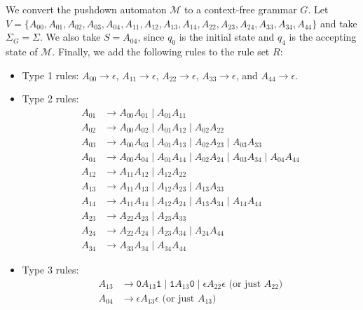 \begin{example}
We convert the pushdown automaton $\mathcal{M}$ to a context-free grammar $G$. Let $V = \{A_{00}, A_{01}, A_{02}, A_{03}, A_{04}, A_{11}, A_{12}, A_{13}, A_{14}, A_{22}, A_{23}, A_{24}, \allowbreak A_{33}, A_{34}, A_{44}\}$ and take $\Sigma_{G} = \Sigma$. We also take $S = A_{04}$, since $q_{0}$ is the initial state and $q_{4}$ is the accepting state of $\mathcal{M}$. Finally, we add the following rules to the rule set $R$:
\begin{itemize}
\item Type 1 rules: 
$A_{00} \rightarrow \epsilon$, 
$A_{11} \rightarrow \epsilon$, 
$A_{22} \rightarrow \epsilon$,  
$A_{33} \rightarrow \epsilon$, and 
$A_{44} \rightarrow \epsilon$.
\item Type 2 rules: 
\begin{align*}
A_{01} &\rightarrow A_{00}A_{01} \mid A_{01}A_{11} \\
A_{02} &\rightarrow A_{00}A_{02} \mid  A_{01}A_{12} \mid A_{02}A_{22} \\
A_{03} &\rightarrow A_{00}A_{03} \mid A_{01}A_{13} \mid A_{02}A_{23} \mid A_{03}A_{33} \\
A_{04} &\rightarrow A_{00}A_{04} \mid A_{01}A_{14} \mid A_{02}A_{24} \mid A_{03}A_{34} \mid A_{04}A_{44} \\
A_{12} &\rightarrow A_{11}A_{12} \mid A_{12}A_{22} \\
A_{13} &\rightarrow A_{11}A_{13} \mid A_{12}A_{23} \mid A_{13}A_{33} \\
A_{14} &\rightarrow A_{11}A_{14} \mid A_{12}A_{24} \mid A_{13}A_{34} \mid A_{14}A_{44} \\
A_{23} &\rightarrow A_{22}A_{23} \mid A_{23}A_{33} \\
A_{24} &\rightarrow A_{22}A_{24} \mid A_{23}A_{34} \mid A_{24}A_{44} \\
A_{34} &\rightarrow A_{33}A_{34} \mid A_{34}A_{44}
\end{align*}
\item Type 3 rules: 
\begin{align*}
A_{13} &\rightarrow \texttt{0}A_{13}\texttt{1} \mid \texttt{1}A_{13}\texttt{0} \mid \epsilon A_{22} \epsilon \text{ (or just } A_{22} \text{)} \\
A_{04} &\rightarrow \epsilon A_{13} \epsilon \text{ (or just } A_{13} \text{)}
\end{align*}
\end{itemize}


\end{example}
